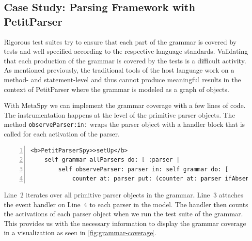 \documentclass[runningheads]{llncs}
\newcommand{\project}{{\sc MetaSpy}\xspace}
\newcommand{\ct}{\lstinline[backgroundcolor=\color{white},basicstyle=\footnotesize\ttfamily]}
\begin{document}
\subsection{Case Study: Parsing Framework with PetitParser}


Rigorous test suites try to ensure that each part of the grammar is covered by tests and well specified according to the respective language standards. Validating that each production of the grammar is covered by the tests is a difficult activity. As mentioned previously, the traditional tools of the host language work on a method- and statement-level and thus cannot produce meaningful results in the context of PetitParser where the grammar is modeled as a graph of objects.

With \project we can implement the grammar coverage with a few lines of code. The instrumentation happens at the level of the primitive parser objects. The method \ct{observeParser:in:} wraps the parser object with a handler block that is called for each activation of the parser.

\begin{lstlisting}[numbers=left]
<b>PetitParserSpy>>setUp</b>
	self grammar allParsers do: [ :parser |
		self observeParser: parser in: self grammar do: [
			counter at: parser put: (counter at: parser ifAbsent: [ 0 ]) + 1 ] ]
\end{lstlisting}

Line~2 iterates over all primitive parser objects in the grammar. Line~3 attaches the event handler on Line~4 to each parser in the model. The handler then counts the activations of each parser object when we run the test suite of the grammar. This provides us with the necessary information to display the grammar coverage in a visualization as seen in \autoref{fig:grammar-coverage}.
\end{document}
